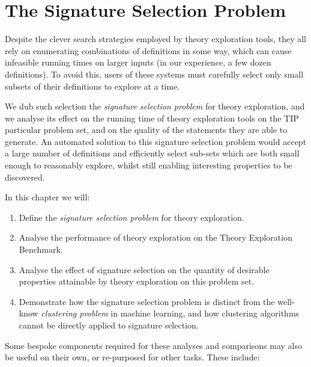 \chapter{The Signature Selection Problem}

Despite the clever search strategies employed by theory exploration tools, they
all rely on enumerating combinations of definitions in some way, which can cause
infeasible running times on larger inputs (in our experience, a few dozen
definitions). To avoid this, users of these systems must carefully select only
small subsets of their definitions to explore at a time.

We dub such selection the \emph{signature selection problem} for theory
exploration, and we analyse its effect on the running time of theory exploration
tools on the TIP particular problem set, and on the quality of the statements
they are able to generate. An automated solution to this signature selection problem would
accept a large number of definitions and efficiently select sub-sets which are
both small enough to reasonably explore, whilst still enabling interesting
properties to be discovered.

In this chapter we will:

\begin{enumerate}
  \item Define the \emph{signature selection problem} for theory exploration.
  \item Analyse the performance of theory exploration on the Theory Exploration
    Benchmark.
  \item Analyse the effect of signature selection on the quantity of desirable properties
    attainable by theory exploration on this problem set.
  \item Demonstrate how the signature selection problem is distinct from the well-know
    \emph{clustering problem} in machine learning, and how clustering algorithms
    cannot be directly applied to signature selection.
\end{enumerate}

Some bespoke components required for these analyses and comparisons may also be
useful on their own, or re-purposed for other tasks. These include:

